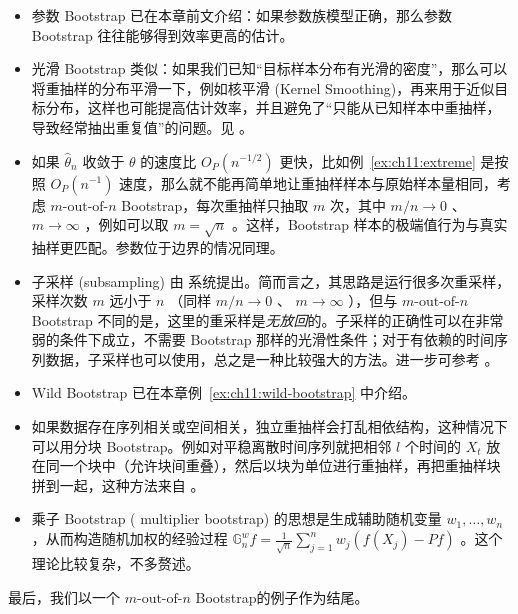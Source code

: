 \begin{itemize}
\tightlist
\item
  参数 Bootstrap 已在本章前文介绍：如果参数族模型正确，那么参数 Bootstrap 往往能够得到效率更高的估计。
\item
  光滑 Bootstrap 类似：如果我们已知``目标样本分布有光滑的密度''，那么可以将重抽样的分布平滑一下，例如核平滑 (Kernel Smoothing)，再来用于近似目标分布，这样也可能提高估计效率，并且避免了``只能从已知样本中重抽样，导致经常抽出重复值''的问题。见 \cite{silvermanyoung1987}。
\item
  如果 $\widehat\theta_n$ 收敛于 $\theta$ 的速度比 $O_P(n^{-1/2})$ 更快，比如例~\ref{ex:ch11:extreme} 是按照 $O_P(n^{-1})$ 速度，那么就不能再简单地让重抽样样本与原始样本量相同，考虑 $\text{$m$-out-of-$n$}$ Bootstrap，每次重抽样只抽取 $m$ 次，其中 $m/n\to 0$ 、 $m\to\infty$ ，例如可以取 $m=\sqrt n$ 。这样，Bootstrap 样本的极端值行为与真实抽样更匹配。参数位于边界的情况同理。
\item
  子采样 (subsampling) 由 \cite{politisromano1994} 系统提出。简而言之，其思路是运行很多次重采样，采样次数 $m$ 远小于 $n$ （同样 $m/n\to 0$ 、 $m\to\infty$ ），但与 $\text{$m$-out-of-$n$}$ Bootstrap 不同的是，这里的重采样是\emph{无放回}的。子采样的正确性可以在非常弱的条件下成立，不需要 Bootstrap 那样的光滑性条件；对于有依赖的时间序列数据，子采样也可以使用，总之是一种比较强大的方法。进一步可参考 \cite{politisromanowolf1999}。
\item
  Wild Bootstrap 已在本章例~\ref{ex:ch11:wild-bootstrap} 中介绍。
\item
  如果数据存在序列相关或空间相关，独立重抽样会打乱相依结构，这种情况下可以用分块 Bootstrap。例如对平稳离散时间序列就把相邻 $l$ 个时间的 $X_t$ 放在同一个块中（允许块间重叠），然后以块为单位进行重抽样，再把重抽样块拼到一起，这种方法来自 \cite{kunsch1989}。
\item
  乘子 Bootstrap ( multiplier bootstrap) 的思想是生成辅助随机变量 $w_1,\dots,w_n$ ，从而构造随机加权的经验过程 $\mathbb G_n^wf=\frac1{\sqrt n}\sum_{j=1}^nw_j(f(X_j)-Pf)$ 。这个理论比较复杂，不多赘述。
\end{itemize}

最后，我们以一个 $\text{$m$-out-of-$n$}$ Bootstrap的例子作为结尾。

